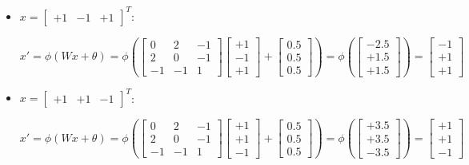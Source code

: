 \documentclass[letterpaper,headings=standardclasses]{scrartcl}
\begin{document}
\begin{itemize}
    \item $x = [\begin{matrix} +1 & -1 & +1 \end{matrix}]^T$:
    
    $$ x' = \phi(Wx + \theta) = \phi \left( \left[ \begin{matrix} 0 & 2 & -1 \\ 2 & 0 & -1 \\ -1 & -1 & 1 \end{matrix} \right] \left[ \begin{matrix} +1 \\ -1 \\ +1 \end{matrix} \right] + \left[ \begin{matrix} 0.5 \\ 0.5 \\ 0.5 \end{matrix} \right] \right) = \phi \left( \left[ \begin{matrix} -2.5 \\ +1.5 \\ +1.5 \end{matrix} \right] \right) = \left[ \begin{matrix} -1 \\ +1 \\ +1 \end{matrix} \right] $$

    \item $x = [\begin{matrix} +1 & +1 & -1 \end{matrix}]^T$:
    
    $$ x' = \phi(Wx + \theta) = \phi \left( \left[ \begin{matrix} 0 & 2 & -1 \\ 2 & 0 & -1 \\ -1 & -1 & 1 \end{matrix} \right] \left[ \begin{matrix} +1 \\ +1 \\ -1 \end{matrix} \right] + \left[ \begin{matrix} 0.5 \\ 0.5 \\ 0.5 \end{matrix} \right] \right) = \phi \left( \left[ \begin{matrix} +3.5 \\ +3.5 \\ -3.5 \end{matrix} \right] \right) = \left[ \begin{matrix} +1 \\ +1 \\ -1 \end{matrix} \right] $$
    

\end{itemize}
\end{document}
